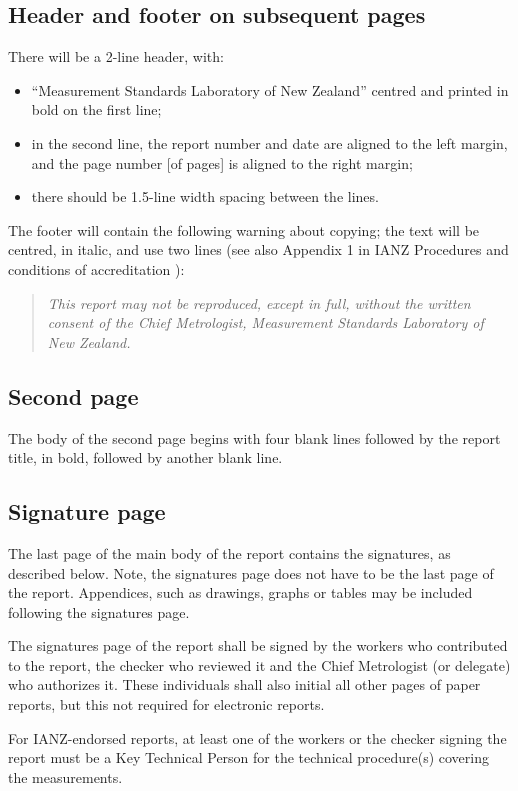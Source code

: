 \subsection{Header and footer on subsequent pages}
There will be a 2-line header, with: 
\begin{itemize}
\item	``Measurement Standards Laboratory of New Zealand'' centred and printed in bold on the first line; 
\item	in the second line, the report number and date are aligned to the left margin, and the page number [of pages] is aligned to the right margin;
\item	there should be 1.5-line width spacing between the lines.
\end{itemize}
The footer will contain the following warning about copying; the text will be centred, in italic, and use two lines (see also Appendix 1 in IANZ Procedures and conditions of accreditation \cite{IANZ_PC}): 
\begin{quote}
\centering\textit{This report may not be reproduced, except in full, without the written consent of the Chief Metrologist, Measurement Standards Laboratory of New Zealand.}
\end{quote}

\subsection{Second page}
The body of the second page begins with four blank lines followed by the report title, in bold, followed by another blank line.

\subsection{Signature page}
The last page of the main body of the report contains the signatures, as described below. Note, the signatures page does not have to be the last page of the report. Appendices, such as drawings, graphs or tables may be included following the signatures page.

The signatures page of the report shall be signed by the workers who contributed to the report, the checker who reviewed it and the Chief Metrologist (or delegate) who authorizes it. These individuals shall also initial all other pages of paper reports, but this not required for electronic reports.

For IANZ-endorsed reports, at least one of the workers or the checker signing the report must be a Key Technical Person for the technical procedure(s)  covering the measurements.

